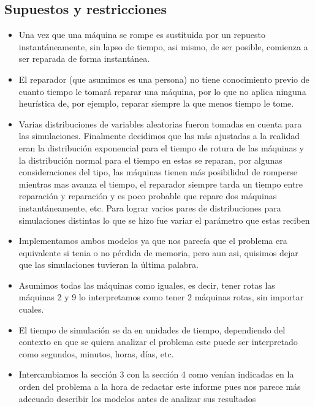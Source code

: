 \documentclass[11pt]{article}
\begin{document}
    \subsection{Supuestos y restricciones}
    \begin{itemize}
        \item Una vez que una máquina se rompe es sustituida por un repuesto instantáneamente, sin lapso de tiempo, 
        asi mismo, de ser posible, comienza a ser reparada de forma instantánea.

        \item El reparador (que asumimos es una persona) no tiene conocimiento previo de cuanto tiempo le tomará 
        reparar una máquina, por lo que no aplica ninguna heurística de, por ejemplo, reparar siempre la que menos 
        tiempo le tome.
        
        \item Varias distribuciones de variables aleatorias fueron tomadas en cuenta para las simulaciones. Finalmente 
        decidimos que las más ajustadas a la realidad eran la distribución exponencial para el tiempo de rotura de las 
        máquinas y la distribución normal para el tiempo en estas se reparan, por algunas consideraciones del tipo, 
        las máquinas tienen más posibilidad de romperse mientras mas avanza el tiempo, el reparador siempre tarda un 
        tiempo entre reparación y reparación y es poco probable que repare dos máquinas instantáneamente, etc. Para 
        lograr varios pares de distribuciones para simulaciones distintas lo que se hizo fue variar el parámetro que estas 
        reciben
        
        \item Implementamos ambos modelos ya que nos parecía que el problema era equivalente si tenia o no 
        pérdida de memoria, pero aun asi, quisimos dejar que las simulaciones tuvieran la última palabra.
        
        \item Asumimos todas las máquinas como iguales, es decir, tener rotas las máquinas 2 y 9 lo interpretamos como 
        tener 2 máquinas rotas, sin importar cuales.
        
        \item El tiempo de simulación se da en unidades de tiempo, dependiendo del contexto en que se quiera analizar el 
        problema este puede ser interpretado como segundos, minutos, horas, días, etc.
        
        \item Intercambiamos la sección 3 con la sección 4 como venían indicadas en la orden del problema a la hora de 
        redactar este informe pues nos parece más adecuado describir los modelos antes de analizar sus resultados
    \end{itemize}
\end{document}
